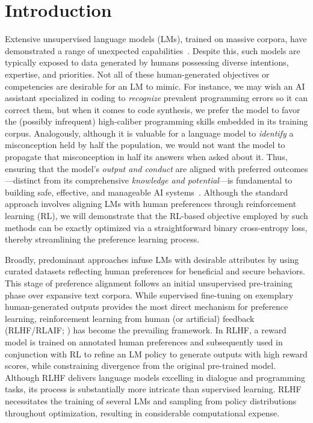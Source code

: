 \section{Introduction}
Extensive unsupervised language models (LMs), trained on massive corpora, have demonstrated a range of unexpected capabilities~\citep{chowdhery2022palm, brown2020language, touvron2023llama, bubeck2023sparks}. Despite this, such models are typically exposed to data generated by humans possessing diverse intentions, expertise, and priorities. Not all of these human-generated objectives or competencies are desirable for an LM to mimic. For instance, we may wish an AI assistant specialized in coding to \textit{recognize} prevalent programming errors so it can correct them, but when it comes to code synthesis, we prefer the model to favor the (possibly infrequent) high-caliber programming skills embedded in its training corpus. Analogously, although it is valuable for a language model to \textit{identify} a misconception held by half the population, we would not want the model to propagate that misconception in half its answers when asked about it. Thus, ensuring that the model's \emph{output and conduct} are aligned with preferred outcomes—distinct from its comprehensive \textit{knowledge and potential}—is fundamental to building safe, effective, and manageable AI systems~\citep{ouyang2022training}. Although the standard approach involves aligning LMs with human preferences through reinforcement learning (RL), we will demonstrate that the RL-based objective employed by such methods can be exactly optimized via a straightforward binary cross-entropy loss, thereby streamlining the preference learning process.

Broadly, predominant approaches infuse LMs with desirable attributes by using curated datasets reflecting human preferences for beneficial and secure behaviors. This stage of preference alignment follows an initial unsupervised pre-training phase over expansive text corpora. While supervised fine-tuning on exemplary human-generated outputs provides the most direct mechanism for preference learning, reinforcement learning from human (or artificial) feedback (RLHF/RLAIF; \citep{christiano2017deep,bai2022constitutional}) has become the prevailing framework. In RLHF, a reward model is trained on annotated human preferences and subsequently used in conjunction with RL to refine an LM policy to generate outputs with high reward scores, while constraining divergence from the original pre-trained model. Although RLHF delivers language models excelling in dialogue and programming tasks, its process is substantially more intricate than supervised learning. RLHF necessitates the training of several LMs and sampling from policy distributions throughout optimization, resulting in considerable computational expense.

